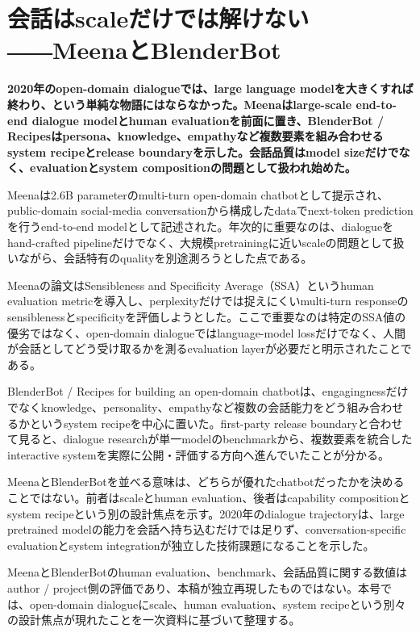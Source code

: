 \section{会話はscaleだけでは解けない――MeenaとBlenderBot}
\label{pkg:dialogue-systems}
\noindent\textbf{2020年のopen-domain dialogueでは、large language modelを大きくすれば終わり、という単純な物語にはならなかった。Meenaはlarge-scale end-to-end dialogue modelとhuman evaluationを前面に置き、BlenderBot / Recipesはpersona、knowledge、empathyなど複数要素を組み合わせるsystem recipeとrelease boundaryを示した。会話品質はmodel sizeだけでなく、evaluationとsystem compositionの問題として扱われ始めた。}\autocite{src-66cb10bf43ff,src-8260c320e205,src-8930f1933983}

Meenaは2.6B parameterのmulti-turn open-domain chatbotとして提示され、public-domain social-media conversationから構成したdataでnext-token predictionを行うend-to-end modelとして記述された。年次的に重要なのは、dialogueをhand-crafted pipelineだけでなく、大規模pretrainingに近いscaleの問題として扱いながら、会話特有のqualityを別途測ろうとした点である。\autocite{src-8930f1933983}


Meenaの論文はSensibleness and Specificity Average（SSA）というhuman evaluation metricを導入し、perplexityだけでは捉えにくいmulti-turn responseのsensiblenessとspecificityを評価しようとした。ここで重要なのは特定のSSA値の優劣ではなく、open-domain dialogueではlanguage-model lossだけでなく、人間が会話としてどう受け取るかを測るevaluation layerが必要だと明示されたことである。\autocite{src-8930f1933983}


BlenderBot / Recipes for building an open-domain chatbotは、engagingnessだけでなくknowledge、personality、empathyなど複数の会話能力をどう組み合わせるかというsystem recipeを中心に置いた。first-party release boundaryと合わせて見ると、dialogue researchが単一modelのbenchmarkから、複数要素を統合したinteractive systemを実際に公開・評価する方向へ進んでいたことが分かる。\autocite{src-66cb10bf43ff,src-8260c320e205}


MeenaとBlenderBotを並べる意味は、どちらが優れたchatbotだったかを決めることではない。前者はscaleとhuman evaluation、後者はcapability compositionとsystem recipeという別の設計焦点を示す。2020年のdialogue trajectoryは、large pretrained modelの能力を会話へ持ち込むだけでは足りず、conversation-specific evaluationとsystem integrationが独立した技術課題になることを示した。\autocite{src-66cb10bf43ff,src-8260c320e205,src-8930f1933983}


\begin{claimboundary}
MeenaとBlenderBotのhuman evaluation、benchmark、会話品質に関する数値はauthor / project側の評価であり、本稿が独立再現したものではない。本号では、open-domain dialogueにscale、human evaluation、system recipeという別々の設計焦点が現れたことを一次資料に基づいて整理する。\autocite{src-66cb10bf43ff,src-8260c320e205,src-8930f1933983}
\end{claimboundary}
